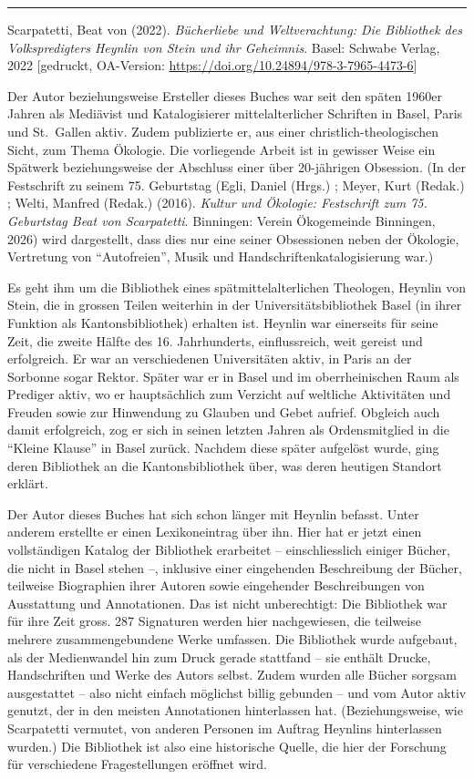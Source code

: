 \documentclass[a4paper,
fontsize=11pt,
oneside,
numbers=noperiodatend,
parskip=half-,
bibliography=totoc,
final
]{scrartcl}
\begin{document}
\begin{center}\rule{0.5\linewidth}{0.5pt}\end{center}

Scarpatetti, Beat von (2022). \emph{Bücherliebe und Weltverachtung: Die
Bibliothek des Volkspredigters Heynlin von Stein und ihr Geheimnis}.
Basel: Schwabe Verlag, 2022 {[}gedruckt, OA-Version:
\url{https://doi.org/10.24894/978-3-7965-4473-6}{]}

Der Autor beziehungsweise Ersteller dieses Buches war seit den späten
1960er Jahren als Mediävist und Katalogisierer mittelalterlicher
Schriften in Basel, Paris und St.~Gallen aktiv. Zudem publizierte er,
aus einer christlich-theologischen Sicht, zum Thema Ökologie. Die
vorliegende Arbeit ist in gewisser Weise ein Spätwerk beziehungsweise
der Abschluss einer über 20-jährigen Obsession. (In der Festschrift zu
seinem 75. Geburtstag (Egli, Daniel (Hrgs.) ; Meyer, Kurt (Redak.) ;
Welti, Manfred (Redak.) (2016). \emph{Kultur und Ökologie: Festschrift
zum 75. Geburtstag Beat von Scarpatetti}. Binningen: Verein Ökogemeinde
Binningen, 2026) wird dargestellt, dass dies nur eine seiner Obsessionen
neben der Ökologie, Vertretung von \enquote{Autofreien}, Musik und
Handschriftenkatalogisierung war.)

Es geht ihm um die Bibliothek eines spätmittelalterlichen Theologen,
Heynlin von Stein, die in grossen Teilen weiterhin in der
Universitätsbibliothek Basel (in ihrer Funktion als Kantonsbibliothek)
erhalten ist. Heynlin war einerseits für seine Zeit, die zweite Hälfte
des 16. Jahrhunderts, einflussreich, weit gereist und erfolgreich. Er
war an verschiedenen Universitäten aktiv, in Paris an der Sorbonne sogar
Rektor. Später war er in Basel und im oberrheinischen Raum als Prediger
aktiv, wo er hauptsächlich zum Verzicht auf weltliche Aktivitäten und
Freuden sowie zur Hinwendung zu Glauben und Gebet aufrief. Obgleich auch
damit erfolgreich, zog er sich in seinen letzten Jahren als
Ordensmitglied in die \enquote{Kleine Klause} in Basel zurück. Nachdem
diese später aufgelöst wurde, ging deren Bibliothek an die
Kantonsbibliothek über, was deren heutigen Standort erklärt.

Der Autor dieses Buches hat sich schon länger mit Heynlin befasst. Unter
anderem erstellte er einen Lexikoneintrag über ihn. Hier hat er jetzt
einen vollständigen Katalog der Bibliothek erarbeitet -- einschliesslich
einiger Bücher, die nicht in Basel stehen --, inklusive einer
eingehenden Beschreibung der Bücher, teilweise Biographien ihrer Autoren
sowie eingehender Beschreibungen von Ausstattung und Annotationen. Das
ist nicht unberechtigt: Die Bibliothek war für ihre Zeit gross. 287
Signaturen werden hier nachgewiesen, die teilweise mehrere
zusammengebundene Werke umfassen. Die Bibliothek wurde aufgebaut, als
der Medienwandel hin zum Druck gerade stattfand -- sie enthält Drucke,
Handschriften und Werke des Autors selbst. Zudem wurden alle Bücher
sorgsam ausgestattet -- also nicht einfach möglichst billig gebunden --
und vom Autor aktiv genutzt, der in den meisten Annotationen
hinterlassen hat. (Beziehungsweise, wie Scarpatetti vermutet, von
anderen Personen im Auftrag Heynlins hinterlassen wurden.) Die
Bibliothek ist also eine historische Quelle, die hier der Forschung für
verschiedene Fragestellungen eröffnet wird.
\end{document}
